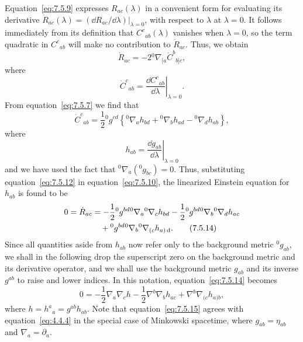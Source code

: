Equation~\eqref{eq:7.5.9} expresses \(R_{ac}(\lambda)\) in a convenient form for
evaluating its derivative
\(\dot R_{ac}(\lambda)=(\dd R_{ac}/\dd\lambda)|_{\lambda=0}\), with respect to
\(\lambda\) at \(\lambda=0\). It follows immediately from its definition that
\(C^c{}_{ab}(\lambda)\) vanishes when \(\lambda=0\), so the term quadratic in
\(C^c{}_{ab}\) will make no contribution to \(\dot R_{ac}\). Thus, we obtain
\begin{equation}
  \dot R_{ac}
    =-2{}^{0}\nabla_{[a}\dot C^b{}_{b]c} ,
  \tag{7.5.10}\label{eq:7.5.10}
\end{equation}
where
\begin{equation}
  \dot C^c{}_{ab}
    =\left.\frac{\dd C^c{}_{ab}}{\dd\lambda}\right|_{\lambda=0} .
  \tag{7.5.11}\label{eq:7.5.11}
\end{equation}
From equation~\eqref{eq:7.5.7} we find that
\begin{equation}
  \dot C^c{}_{ab}
    =\frac12{}^{0}g^{cd}
      \left\{
        {}^{0}\nabla_ah_{bd}
        +{}^{0}\nabla_bh_{ad}
        -{}^{0}\nabla_dh_{ab}
      \right\} ,
  \tag{7.5.12}\label{eq:7.5.12}
\end{equation}
where
\begin{equation}
  h_{ab}
    =\left.\frac{\dd g_{ab}}{\dd\lambda}\right|_{\lambda=0}
  \tag{7.5.13}\label{eq:7.5.13}
\end{equation}
and we have used the fact that
\({}^{0}\nabla_a({}^{0}g_{bc})=0\). Thus, substituting
equation~\eqref{eq:7.5.12} in equation~\eqref{eq:7.5.10}, the linearized Einstein
equation for \(h_{ab}\) is found to be
\begin{align}
  0=\dot R_{ac}
    &=-\frac12{}^{0}g^{bd}
        {}^{0}\nabla_a{}^{0}\nabla_ch_{bd}
      -\frac12{}^{0}g^{bd}
        {}^{0}\nabla_b{}^{0}\nabla_dh_{ac} \notag\\
    &\quad+{}^{0}g^{bd}
        {}^{0}\nabla_b{}^{0}\nabla_{(c}h_{a)\mathop{}\!\mathrm{d}} .
  \tag{7.5.14}\label{eq:7.5.14}
\end{align}
Since all quantities aside from \(h_{ab}\) now refer only to the background metric
\({}^{0}g_{ab}\), we shall in the following drop the superscript zero on the
background metric and its derivative operator, and we shall use the background
metric \(g_{ab}\) and its inverse \(g^{ab}\) to raise and lower indices. In this
notation, equation~\eqref{eq:7.5.14} becomes
\begin{equation}
  0=-\frac12\nabla_a\nabla_ch
    -\frac12\nabla^b\nabla_bh_{ac}
    +\nabla^b\nabla_{(c}h_{a)b} ,
  \tag{7.5.15}\label{eq:7.5.15}
\end{equation}
where \(h=h^a{}_a=g^{ab}h_{ab}\). Note that equation~\eqref{eq:7.5.15} agrees
with equation~\eqref{eq:4.4.4} in the special case of Minkowski spacetime, where
\(g_{ab}=\eta_{ab}\) and \(\nabla_a=\partial_a\).

